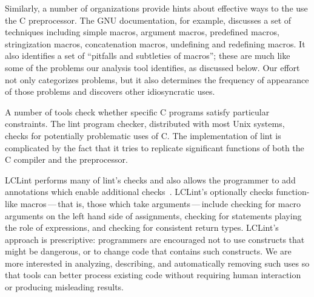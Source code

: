 \documentclass[11pt]{article}
\begin{document}
Similarly, a number of organizations provide hints about effective ways to
the use the C preprocessor.  The GNU documentation, for example, discusses
a set of techniques including simple macros, argument macros, predefined
macros, stringization macros, concatenation macros, undefining and
redefining macros.  It also identifies a set of ``pitfalls and subtleties
of macros''; these are much like some of the problems our analysis tool
identifies, as discussed below.  Our effort not only categorizes problems,
but it also determines the frequency of appearance of those problems and
discovers other idiosyncratic uses.

A number of tools check whether specific C programs satisfy particular
constraints.  The lint program checker, distributed with most Unix systems,
checks for potentially problematic uses of C\@.  The implementation of lint
is complicated by the fact that it tries to replicate significant functions
of both the C compiler and the preprocessor.

LCLint performs many of lint's checks and also
allows the programmer to add annotations which enable additional
checks~\cite{Evans-pldi96,Evans-fse94}.
LCLint's  optionally checks function-like
macros\,---\,that is, those which take arguments\,---\,include checking for
macro arguments on the left hand side of assignments, checking for statements
playing the role of expressions, and checking for consistent return types.
LCLint's approach is prescriptive: programmers are encouraged not to use
constructs that might be dangerous, or to change code that contains such
constructs.  We are more interested in analyzing, describing, and
automatically removing such uses so that tools can better process existing
code without requiring human interaction or producing misleading results.
\end{document}
